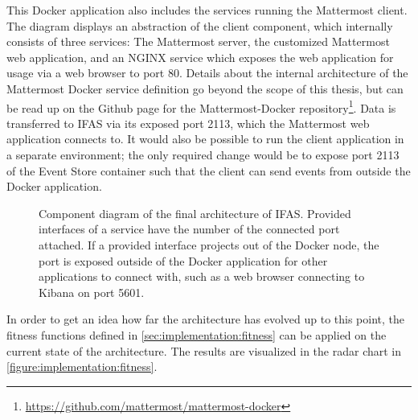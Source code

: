 This Docker application also includes the services running the Mattermost client.
The diagram displays an abstraction of the client component, which internally consists of three services:
The Mattermost server, the customized Mattermost web application, and an NGINX service which exposes the web application for usage via a web browser to port 80.
Details about the internal architecture of the Mattermost Docker service definition go beyond the scope of this thesis, but can be read up on the Github page for the Mattermost-Docker repository\footnote{\url{https://github.com/mattermost/mattermost-docker}}.
Data is transferred to \ac{IFAS} via its exposed port 2113, which the Mattermost web application connects to.
It would also be possible to run the client application in a separate environment; the only required change would be to expose port 2113 of the Event Store container such that the client can send events from outside the Docker application.

\begin{figure}[ht]
        \caption[Component diagram of the final architecture of \ac{IFAS}.]{
        Component diagram of the final architecture of \ac{IFAS}.
        Provided interfaces of a service have the number of the connected port attached.
        If a provided interface projects out of the Docker node, the port is exposed outside of the Docker application for other applications to connect with, such as a web browser connecting to Kibana on port 5601.}
        \label{figure:design:architecture}
\end{figure}

In order to get an idea how far the architecture has evolved up to this point, the fitness functions defined in \cref{sec:implementation:fitness} can be applied on the current state of the architecture.
The results are visualized in the radar chart in \cref{figure:implementation:fitness}.

